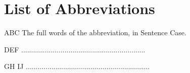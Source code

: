 \chapter*{List of Abbreviations}

\begin{leftitemize}
    \item[ABC] The full words of the abbreviation, in Sentence Case.
    \item[DEF] ...............................................................
    \item[GH IJ] ...............................................................
\end{leftitemize}
